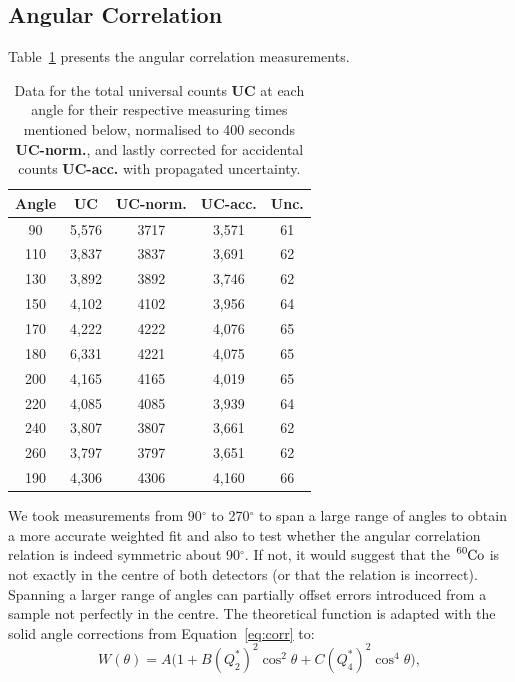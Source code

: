 \documentclass[twocolumn]{article}
\begin{document}
\subsection{Angular Correlation}
Table~\ref{tab:data} presents the angular correlation measurements. 
\begin{table}[htbp]
	\centering
	\begin{tabular}{c||c|c||c|c}
		\hline
		\textbf{Angle} & \textbf{UC} & \textbf{UC-norm.} & \textbf{UC-acc.} & \textbf{Unc.} \\ \hline \hline
		90    & 5,576 & 3717  & 3,571 & 61 \\ \hline
		110   & 3,837 & 3837  & 3,691 & 62 \\ \hline
		130   & 3,892 & 3892  & 3,746 & 62 \\ \hline
		150   & 4,102 & 4102  & 3,956 & 64 \\ \hline
		170   & 4,222 & 4222  & 4,076 & 65 \\ \hline
		180   & 6,331 & 4221  & 4,075 & 65 \\ \hline
		200   & 4,165 & 4165  & 4,019 & 65 \\ \hline
		220   & 4,085 & 4085  & 3,939 & 64 \\ \hline
		240   & 3,807 & 3807  & 3,661 & 62 \\ \hline
		260   & 3,797 & 3797  & 3,651 & 62 \\ \hline
		190   & 4,306 & 4306  & 4,160 & 66 \\ \hline \hline

	\end{tabular}%
			\caption{Data for the total universal counts \textbf{UC} at each angle for their respective measuring times mentioned below, normalised to 400 seconds \textbf{UC-norm.}, and lastly corrected for accidental counts \textbf{UC-acc.} with propagated uncertainty.} 
	\label{tab:data}%
\end{table}%
We took measurements from 90$^{\circ}$ to 270$^{\circ}$ to span a large range of angles to obtain a more accurate weighted fit and also to test whether the angular correlation relation is indeed symmetric about 90$^{\circ}$. If not, it would suggest that the $\ce{^{60}Co}$ is not exactly in the centre of both detectors (or that the relation is incorrect). Spanning a larger range of angles can partially offset errors introduced from a sample not perfectly in the centre. The theoretical function is adapted with the solid angle corrections from Equation~\ref{eq:corr} to:
\begin{equation}
W(\theta) = A \big(1 + B (Q^{*}_2)^2 \cos^2 \theta + C (Q^{*}_4)^2 \cos^4 \theta \big), \label{eq:fit}
\end{equation} 
\end{document}
